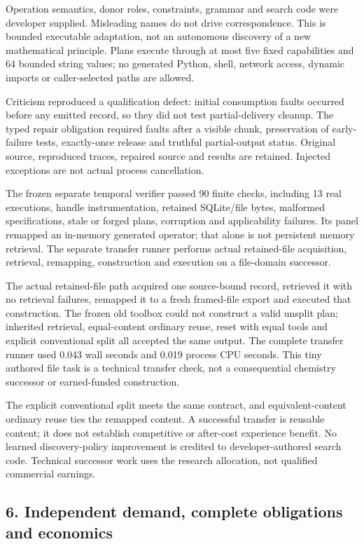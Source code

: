 \documentclass[
  10pt,
]{article}
\begin{document}
Operation semantics, donor roles, constraints, grammar and search code
were developer supplied. Misleading names do not drive correspondence.
This is bounded executable adaptation, not an autonomous discovery of a
new mathematical principle. Plans execute through at most five fixed
capabilities and 64 bounded string values; no generated Python, shell,
network access, dynamic imports or caller-selected paths are allowed.

Criticism reproduced a qualification defect: initial consumption faults
occurred before any emitted record, so they did not test
partial-delivery cleanup. The typed repair obligation required faults
after a visible chunk, preservation of early-failure tests, exactly-once
release and truthful partial-output status. Original source, reproduced
traces, repaired source and results are retained. Injected exceptions
are not actual process cancellation.

The frozen separate temporal verifier passed 90 finite checks, including
13 real executions, handle instrumentation, retained SQLite/file bytes,
malformed specifications, stale or forged plans, corruption and
applicability failures. Its panel remapped an in-memory generated
operator; that alone is not persistent memory retrieval. The separate
transfer runner performs actual retained-file acquisition, retrieval,
remapping, construction and execution on a file-domain successor.

The actual retained-file path acquired one source-bound record,
retrieved it with no retrieval failures, remapped it to a fresh
framed-file export and executed that construction. The frozen old
toolbox could not construct a valid unsplit plan; inherited retrieval,
equal-content ordinary reuse, reset with equal tools and explicit
conventional split all accepted the same output. The complete transfer
runner used 0.043 wall seconds and 0.019 process CPU seconds. This tiny
authored file task is a technical transfer check, not a consequential
chemistry successor or earned-funded construction.

The explicit conventional split meets the same contract, and
equivalent-content ordinary reuse ties the remapped content. A
successful transfer is reusable content; it does not establish
competitive or after-cost experience benefit. No learned
discovery-policy improvement is credited to developer-authored search
code. Technical successor work uses the research allocation, not
qualified commercial earnings.

\hypertarget{independent-demand-complete-obligations-and-economics}{%
\subsection{6. Independent demand, complete obligations and
economics}\label{independent-demand-complete-obligations-and-economics}}
\end{document}
